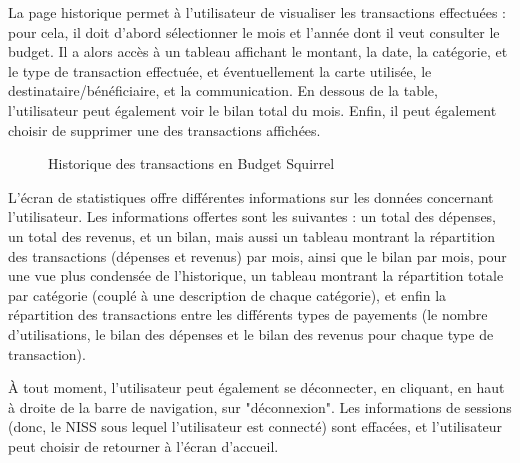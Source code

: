 \documentclass[a4paper,12pt]{article}
\begin{document}
\newpage
La page historique permet à l'utilisateur de visualiser les transactions effectuées : pour cela, il doit d'abord sélectionner le mois et l'année dont il veut consulter le budget. Il a alors accès à un tableau affichant le montant, la date, la catégorie, et le type de transaction effectuée, et éventuellement la carte utilisée, le destinataire/bénéficiaire, et la communication. En dessous de la table, l'utilisateur peut également voir le bilan total du mois. Enfin, il peut également choisir de supprimer une des transactions affichées.

\begin{figure}[!ht]
\noindent
{}
\caption{\footnotesize{Historique des transactions en Budget Squirrel}}
\end{figure}

L'écran de statistiques offre différentes informations sur les données concernant l'utilisateur. Les informations offertes sont les suivantes : un total des dépenses, un total des revenus, et un bilan, mais aussi un tableau montrant la répartition des transactions (dépenses et revenus) par mois, ainsi que le bilan par mois, pour une vue plus condensée de l'historique, un tableau montrant la répartition totale par catégorie (couplé à une description de chaque catégorie), et  enfin la répartition des transactions entre les différents types de payements (le nombre d'utilisations, le bilan des dépenses et le bilan des revenus pour chaque type de transaction).

À tout moment, l'utilisateur peut également se déconnecter, en cliquant, en haut à droite de la barre de navigation, sur "déconnexion". Les informations de sessions (donc, le NISS sous lequel l'utilisateur est connecté) sont effacées, et l'utilisateur peut choisir de retourner à l'écran d'accueil.
\end{document}
